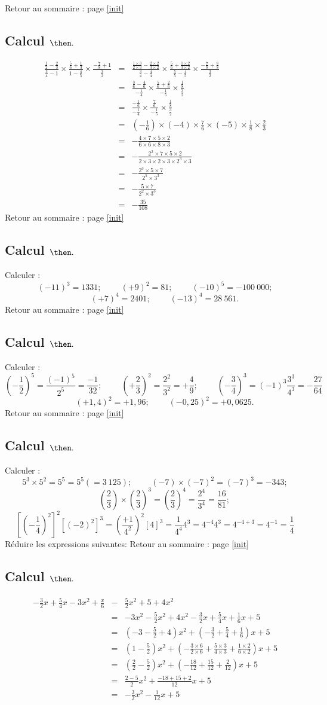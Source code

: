 \documentclass[14pt]{article}
\theoremstyle{remark}
\newcounter{n}
\renewcommand{\it}{Retour au sommaire : page \ref{init}
	\subsection{Calcul $ \mathbf{ \then}.$}\label{\then} \stepcounter{n} }
\theoremstyle{plain}
\begin{document}
\it \begin{eqnarray*}\frac{\frac12-\frac23}{\frac34-1}\times \frac{\frac56+\frac13}{1-\frac45}\times \frac{-\frac78+1}{\frac32} &=& \frac{\frac{1\times3}{2\times3}
-\frac{2\times2}{3\times2}}{\frac34-\frac44}\times \frac{\frac56+\frac{1\times2}{3\times2}}{\frac55-\frac45}\times\frac{-\frac78+\frac88}{\frac32} \\
&=& \frac{\frac36-\frac46}{-\frac14}\times\frac{\frac56+\frac26}{-\frac15}\times\frac{\frac18}{\frac32}\\
&=&\frac{-\frac16}{-\frac14}\times\frac{\frac76}{-\frac15}\times\frac{\frac18}{\frac32}\\
&=& \left(-\frac16\right)\times(-4)\times\frac76\times(-5)\times\frac18\times\frac23\\
&=& - \frac{4\times7\times5\times2}{6\times6\times8\times3}\\
&=& - \frac{2^2\times7\times5\times2}{2\times3\times2\times3\times2^3\times3}\\
&=& - \frac{2^3\times5\times7}{2^5\times3^3}\\
&=& - \frac{5\times7}{2^2\times3^3} \\
&=& - \frac{35}{108}
\end{eqnarray*}
\it Calculer : \[ (-11)^3 =  1331; \phantom{miou}(+9)^2=81; \phantom{miou}(-10)^5=-100~000;\]\[ \phantom{miou}(+7)^4=2401; \phantom{miou}(-13)^4=28~561.\]
\it Calculer : \[ \left(-\frac12\right)^5 = \frac{(-1)^5}{2^5}=\frac{-1}{32}; \phantom{miou}\left(+\frac23\right)^2 = \frac{2^2}{3^2}=+\frac{4}9; \phantom{miou}\left(-\frac34\right)^3=(-1)^3\frac{3^3}{4^3}=-\frac{27}{64}\] \[ \phantom{miou}(+1,4)^2=+1,96; \phantom{miou}(-0,25)^2=+0,0625.\]
\it Calculer : \[ 5^3\times 5^2=5^5 =5^5 (=3~125) ; \phantom{miou}(-7)\times(-7)^2=(-7)^3 = -343;\]
\[ \phantom{miou}\left(\frac23\right)\times \left(\frac23\right)^3=\left(\frac23\right)^4=\frac{2^4}{3^4}=\frac{16}{81}; \]\[
\left[\left(-\frac14\right)^2\right]^2\left[(-2)^2\right]^3=
\left(\frac{+1}{4^2}\right)^{2}[4]^{3} = \frac1{4^4}4^3
=4^{-4}4^3=4^{-4+3}=4^{-1}=\frac14
\]
Réduire les expressions suivantes: 
\it \begin{eqnarray*}
-\frac32 x + \frac54 x-3x^2+\frac{x}6&-&\frac52 x^2+5+4x^2\\&=& -3x^2-\frac52x^2+4x^2 -\frac32x+\frac54x+\frac16x+5\\
&=& \left(-3 - \frac52+4\right)x^2 +\left(-\frac32+\frac54+\frac16\right)x+5\\
&=& \left(1 - \frac52\right)x^2+\left(-\frac{3\times6}{2\times6}+\frac{5\times3}{4\times3}+\frac{1\times2}{6\times2}\right)x+5\\
&=& \left(\frac22-\frac52\right)x^2+\left(-\frac{18}{12}+\frac{15}{12}+\frac{2}{12}\right)x+5\\
&=& \frac{2-5}2x^2+\frac{-18+15+2}{12}x+5\\
&=&-\frac32x^2-\frac1{12}x+5
\end{eqnarray*}
\end{document}
